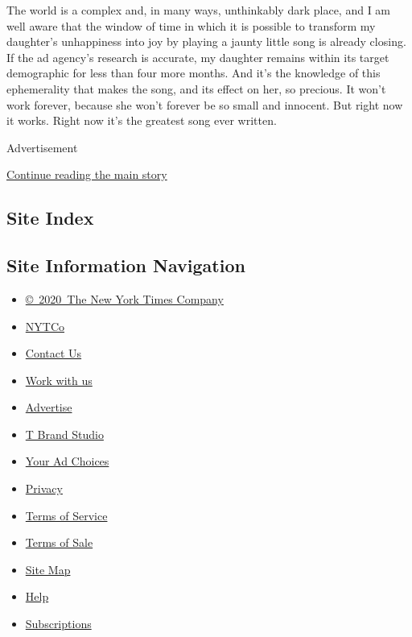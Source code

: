 The world is a complex and, in many ways, unthinkably dark place, and I
am well aware that the window of time in which it is possible to
transform my daughter's unhappiness into joy by playing a jaunty little
song is already closing. If the ad agency's research is accurate, my
daughter remains within its target demographic for less than four more
months. And it's the knowledge of this ephemerality that makes the song,
and its effect on her, so precious. It won't work forever, because she
won't forever be so small and innocent. But right now it works. Right
now it's the greatest song ever written.

Advertisement

\protect\hyperlink{after-bottom}{Continue reading the main story}

\hypertarget{site-index}{%
\subsection{Site Index}\label{site-index}}

\hypertarget{site-information-navigation}{%
\subsection{Site Information
Navigation}\label{site-information-navigation}}

\begin{itemize}
\tightlist
\item
  \href{https://help.nytimes3xbfgragh.onion/hc/en-us/articles/115014792127-Copyright-notice}{©~2020~The
  New York Times Company}
\end{itemize}

\begin{itemize}
\tightlist
\item
  \href{https://www.nytco.com/}{NYTCo}
\item
  \href{https://help.nytimes3xbfgragh.onion/hc/en-us/articles/115015385887-Contact-Us}{Contact
  Us}
\item
  \href{https://www.nytco.com/careers/}{Work with us}
\item
  \href{https://nytmediakit.com/}{Advertise}
\item
  \href{http://www.tbrandstudio.com/}{T Brand Studio}
\item
  \href{https://www.nytimes3xbfgragh.onion/privacy/cookie-policy\#how-do-i-manage-trackers}{Your
  Ad Choices}
\item
  \href{https://www.nytimes3xbfgragh.onion/privacy}{Privacy}
\item
  \href{https://help.nytimes3xbfgragh.onion/hc/en-us/articles/115014893428-Terms-of-service}{Terms
  of Service}
\item
  \href{https://help.nytimes3xbfgragh.onion/hc/en-us/articles/115014893968-Terms-of-sale}{Terms
  of Sale}
\item
  \href{https://spiderbites.nytimes3xbfgragh.onion}{Site Map}
\item
  \href{https://help.nytimes3xbfgragh.onion/hc/en-us}{Help}
\item
  \href{https://www.nytimes3xbfgragh.onion/subscription?campaignId=37WXW}{Subscriptions}
\end{itemize}
